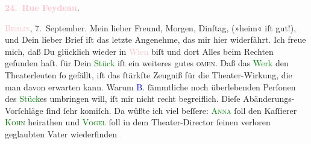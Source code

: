            \pstart
           \begin{otherlanguage}{french}\textcolor{gray}{\textbf{\textbf{\textcolor{pink}{24. Rue Feydeau}{}\ledrightnote{\textcolor{pink}{rue Feydeau}}.}}}\end{otherlanguage}\hfill \textsc{\textcolor{pink}{Berlin}{}\ledrightnote{\textcolor{pink}{Berlin}}}, 7. September.\pend
           \pstart\center{}Mein lieber Freund,\pend\pstart
           Morgen, Dinſtag, \label{K_L02784-1v}\label{K_L02784-1h} (»heim«
               iſt gut!), und Dein lieber Brief iſt das letzte Angenehme, das mir hier
               widerfährt.\pend
           \pstart
           Ich freue mich, daß Du glücklich wieder in \textcolor{pink}{Wien}{}\ledrightnote{\textcolor{pink}{Wien}}
               biſt und dort Alles beim Rechten gefunden haſt.\pend
           \pstart
           \label{K_L02784-2v}\label{K_L02784-2h} für Dein \textcolor{green}{Stück}{} iſt ein
               weiteres gutes \textsc{omen}. Daß das \textcolor{green}{Werk}{} den Theaterleuten ſo gefällt, iſt das
               ſtärkſte Zeugniß für die Theater-Wirkung, die man {\pb}davon erwarten kann. Warum \textcolor{blue}{B.}{} ſämmtliche noch überlebenden Perſonen des \textcolor{green}{Stück}{}es  umbringen will, iſt mir nicht recht begreiflich. Dieſe Abänderungs-Vorſchläge
               ſind ſehr komiſch. Da wüßte ich viel beſſere: \textsc{\textcolor{green}{Anna}{}} ſoll den Kaſſierer \textsc{\textcolor{green}{Kohn}{}} heirathen und \textsc{\textcolor{green}{Vogel}{}} ſoll in dem Theater-Director ſeinen verloren geglaubten Vater wiederfinden{\dotsfive}\pend
